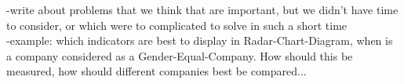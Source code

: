 -write about problems that we think that are important, but we didn't have time to consider, or which were to complicated to solve in such a short time\\
-example: which indicators are best to display in Radar-Chart-Diagram, when is a company considered as a Gender-Equal-Company. How should this be measured, how should different companies best be compared...
